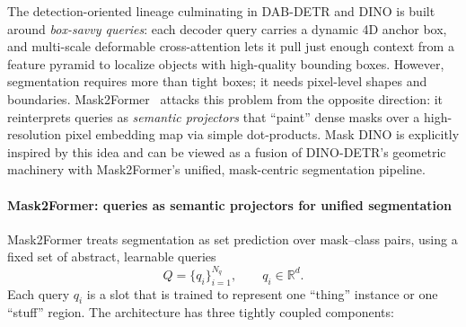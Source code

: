 \begin{enrichment}
\begin{enrichment}
		The detection-oriented lineage culminating in DAB-DETR and DINO is built around \emph{box-savvy queries}: each decoder query carries a dynamic 4D anchor box, and multi-scale deformable cross-attention lets it pull just enough context from a feature pyramid to localize objects with high-quality bounding boxes. However, segmentation requires more than tight boxes; it needs pixel-level shapes and boundaries. Mask2Former~\cite{cheng2022_mask2former} attacks this problem from the opposite direction: it reinterprets queries as \emph{semantic projectors} that ``paint'' dense masks over a high-resolution pixel embedding map via simple dot-products. Mask DINO is explicitly inspired by this idea and can be viewed as a fusion of DINO-DETR's geometric machinery with Mask2Former's unified, mask-centric segmentation pipeline.
		
		\paragraph{Mask2Former: queries as semantic projectors for unified segmentation}
		
		Mask2Former treats segmentation as set prediction over mask--class pairs, using a fixed set of abstract, learnable queries
		\[
		Q = \{q_i\}_{i=1}^{N_q}, \qquad q_i \in \mathbb{R}^d.
		\]
		Each query $q_i$ is a slot that is trained to represent one ``thing'' instance or one ``stuff'' region. The architecture has three tightly coupled components:
		

\end{enrichment}
\end{enrichment}
